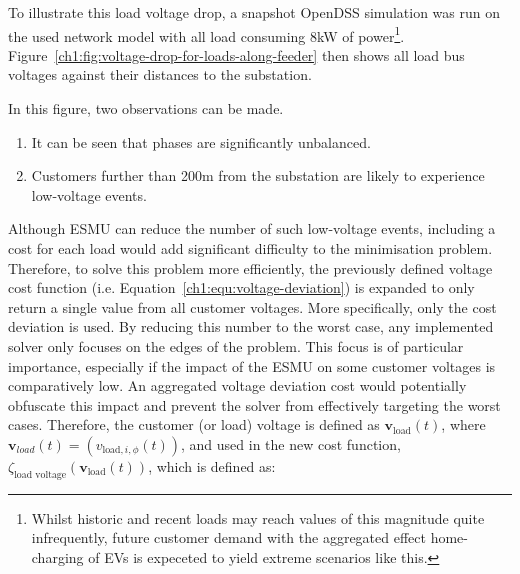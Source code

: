 To illustrate this load voltage drop, a snapshot OpenDSS simulation was run on the used network model with all load consuming  8kW of power\footnote{Whilst historic and recent loads may reach values of this magnitude quite infrequently, future customer demand with the aggregated effect home-charging of EVs is expeceted to yield extreme scenarios like this.}.
Figure~\ref{ch1:fig:voltage-drop-for-loads-along-feeder} then shows all load bus voltages against their distances to the substation.




In this figure, two observations can be made.

\begin{enumerate}
	\item It can be seen that phases are significantly unbalanced. 
	\item Customers further than 200m from the substation are likely to experience low-voltage events.
\end{enumerate}

Although ESMU can reduce the number of such low-voltage events, including a cost for each load would add significant difficulty to the minimisation problem.
Therefore, to solve this problem more efficiently, the previously defined voltage cost function (i.e. Equation~\ref{ch1:equ:voltage-deviation}) is expanded to only return a single value from all customer voltages.
More specifically, only the cost deviation is used.
By reducing this number to the worst case, any implemented solver only focuses on the edges of the problem.
This focus is of particular importance, especially if the impact of the ESMU on some customer voltages is comparatively low.
An aggregated voltage deviation cost would potentially obfuscate this impact and prevent the solver from effectively targeting the worst cases.
Therefore, the customer (or load) voltage is defined as $\textbf{v}_\text{load}(t)$, where $\textbf{v}_{load}(t) = (v_{\text{load},i,\phi}(t))$, and used in the new cost function, $\zeta_\text{load voltage}(\textbf{v}_\text{load}(t))$, which is defined as:

